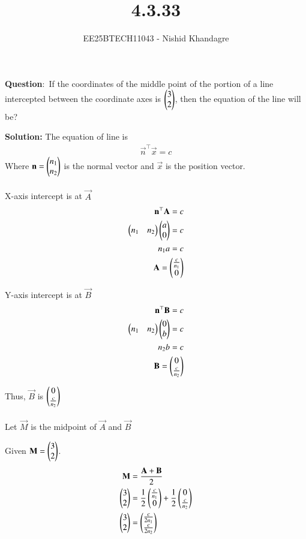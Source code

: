 \documentclass[journal]{IEEEtran}
\title{4.3.33}
\author{EE25BTECH11043 - Nishid Khandagre}
\begin{document}
\maketitle

\renewcommand{\thefigure}{\theenumi}
\renewcommand{\thetable}{\theenumi}


\textbf{Question}:\
If the coordinates of the middle point of the portion of a line intercepted between the
coordinate axes is $\begin{pmatrix}3\\2\end{pmatrix}$, then the equation of the line will be?

\textbf{Solution: }
The equation of line is
\begin{align}
\vec{n}^\top\vec{x} = c
\end{align}
Where $\mathbf{n} = \begin{pmatrix}n_1 \\ n_2\end{pmatrix}$ is the normal vector and $\vec{x}$ is the position vector.\\ \\




X-axis intercept is at $\vec{A}$
\begin{align}
\mathbf{n}^\top\mathbf{A}=c\\
\begin{pmatrix}n_1&n_2\end{pmatrix}\begin{pmatrix}a\\0\end{pmatrix}=c\\
n_1a=c\\
\mathbf{A}=\begin{pmatrix}\frac{c}{n_1}\\0\end{pmatrix}
\end{align}

Y-axis intercept is at $\vec{B}$
\begin{align}
\mathbf{n}^\top\mathbf{B}=c\\
\begin{pmatrix}n_1&n_2\end{pmatrix}\begin{pmatrix}0\\b\end{pmatrix}=c\\
n_2b=c\\
\mathbf{B}=\begin{pmatrix}0\\\frac{c}{n_2}\end{pmatrix}
\end{align}

Thus, $\vec{B}$ is $\begin{pmatrix}0 \\ \frac{c}{n_2}\end{pmatrix}$\\ \\

Let $\vec{M}$ is the midpoint of $\vec{A}$ and $\vec{B}$

Given $\mathbf{M} = \begin{pmatrix}3 \\ 2\end{pmatrix}$.
\begin{align}
\mathbf{M} &= \frac{\mathbf{A} + \mathbf{B}}{2} \\
\begin{pmatrix}3\\2\end{pmatrix}&= \frac{1}{2} \begin{pmatrix}\frac{c}{n_1} \\ 0\end{pmatrix} + \frac{1}{2} \begin{pmatrix}0 \\ \frac{c}{n_2}\end{pmatrix} \\
\begin{pmatrix}3\\2\end{pmatrix}&= \begin{pmatrix}\frac{c}{2n_1} \\ \frac{c}{2n_2}\end{pmatrix}
\end{align}
\end{document}
